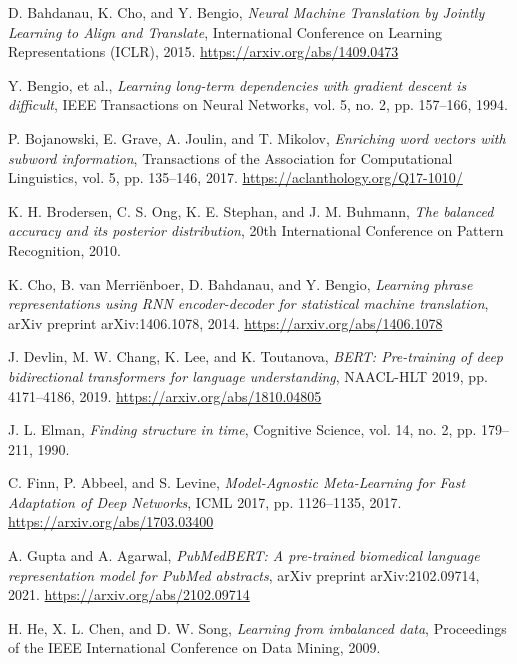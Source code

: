 \documentclass[12pt]{report}
\begin{document}
\newpage
\begin{thebibliography}{99}

D. Bahdanau, K. Cho, and Y. Bengio, 
\textit{Neural Machine Translation by Jointly Learning to Align and Translate}, 
International Conference on Learning Representations (ICLR), 2015. 
\url{https://arxiv.org/abs/1409.0473}

Y. Bengio, et al., 
\textit{Learning long-term dependencies with gradient descent is difficult}, 
IEEE Transactions on Neural Networks, vol. 5, no. 2, pp. 157–166, 1994.

P. Bojanowski, E. Grave, A. Joulin, and T. Mikolov, 
\textit{Enriching word vectors with subword information}, 
Transactions of the Association for Computational Linguistics, vol. 5, pp. 135–146, 2017. 
\url{https://aclanthology.org/Q17-1010/}

K. H. Brodersen, C. S. Ong, K. E. Stephan, and J. M. Buhmann, 
\textit{The balanced accuracy and its posterior distribution}, 
20th International Conference on Pattern Recognition, 2010.

K. Cho, B. van Merriënboer, D. Bahdanau, and Y. Bengio, 
\textit{Learning phrase representations using RNN encoder-decoder for statistical machine translation}, 
arXiv preprint arXiv:1406.1078, 2014. 
\url{https://arxiv.org/abs/1406.1078}

J. Devlin, M. W. Chang, K. Lee, and K. Toutanova, 
\textit{BERT: Pre-training of deep bidirectional transformers for language understanding}, 
NAACL-HLT 2019, pp. 4171–4186, 2019. 
\url{https://arxiv.org/abs/1810.04805}

J. L. Elman, 
\textit{Finding structure in time}, 
Cognitive Science, vol. 14, no. 2, pp. 179–211, 1990.

C. Finn, P. Abbeel, and S. Levine, 
\textit{Model-Agnostic Meta-Learning for Fast Adaptation of Deep Networks}, 
ICML 2017, pp. 1126–1135, 2017. 
\url{https://arxiv.org/abs/1703.03400}

A. Gupta and A. Agarwal, 
\textit{PubMedBERT: A pre-trained biomedical language representation model for PubMed abstracts}, 
arXiv preprint arXiv:2102.09714, 2021. 
\url{https://arxiv.org/abs/2102.09714}

H. He, X. L. Chen, and D. W. Song, 
\textit{Learning from imbalanced data}, 
Proceedings of the IEEE International Conference on Data Mining, 2009.


\end{thebibliography}
\end{document}
